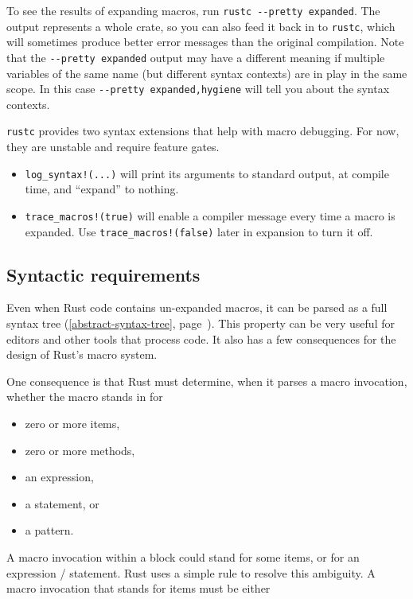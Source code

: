 \documentclass[a4paper,]{book}
\renewcommand*{\hyperref}[2][\ar]{%
  \def\ar{#2}%
  #2 (\autoref{#1}, page~\pageref{#1})}
\begin{document}
To see the results of expanding macros, run
\texttt{rustc\ -\/-pretty\ expanded}. The output represents a whole
crate, so you can also feed it back in to \texttt{rustc}, which will
sometimes produce better error messages than the original compilation.
Note that the \texttt{-\/-pretty\ expanded} output may have a different
meaning if multiple variables of the same name (but different syntax
contexts) are in play in the same scope. In this case
\texttt{-\/-pretty\ expanded,hygiene} will tell you about the syntax
contexts.

\texttt{rustc} provides two syntax extensions that help with macro
debugging. For now, they are unstable and require feature gates.

\begin{itemize}
\item
  \texttt{log\_syntax!(...)} will print its arguments to standard
  output, at compile time, and ``expand'' to nothing.
\item
  \texttt{trace\_macros!(true)} will enable a compiler message every
  time a macro is expanded. Use \texttt{trace\_macros!(false)} later in
  expansion to turn it off.
\end{itemize}

\subsection{Syntactic requirements}\label{syntactic-requirements}

Even when Rust code contains un-expanded macros, it can be parsed as a
full \hyperref[abstract-syntax-tree]{syntax tree}. This property can be
very useful for editors and other tools that process code. It also has a
few consequences for the design of Rust's macro system.

One consequence is that Rust must determine, when it parses a macro
invocation, whether the macro stands in for

\begin{itemize}
\itemsep1pt\parskip0pt
\item
  zero or more items,
\item
  zero or more methods,
\item
  an expression,
\item
  a statement, or
\item
  a pattern.
\end{itemize}

A macro invocation within a block could stand for some items, or for an
expression / statement. Rust uses a simple rule to resolve this
ambiguity. A macro invocation that stands for items must be either
\end{document}

